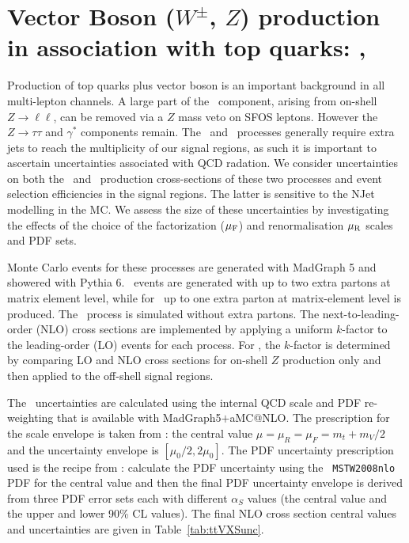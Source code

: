 \section{Vector Boson ($W^{\pm}$, $Z$) production in association with top quarks: \ttV, \tZ}  
\label{section:ttV}
Production of top quarks plus vector boson is an important background in all multi-lepton channels.   A large part of the \ttV\ component, arising from on-shell $Z\to\ell\ell$, can be removed via a $Z$ mass veto on SFOS leptons.  However the $Z \to \tau\tau$ and $\gamma^*$ components remain. The \ttW\ and \tZ\ processes generally require extra jets to reach the multiplicity of our signal regions, as such it is important to ascertain uncertainties associated with QCD radation. We consider uncertainties on both the \ttW\ and \ttZ\ production cross-sections of these two processes and event selection efficiencies in the signal regions. The latter is sensitive to the NJet modelling in the MC. We assess the size of these uncertainties by investigating the effects of the choice of the factorization ($\mu_{\rm F}$) and renormalisation $\mu_{\rm R}$ scales and PDF sets. 

Monte Carlo events for these processes are generated with MadGraph 5 and showered with Pythia 6.  \ttW\ events are generated with up to two extra partons at matrix element level, while for \ttZ\ up to one extra parton at matrix-element level is produced.  The \tZ\ process is simulated without extra partons.  The next-to-leading-order (NLO) cross sections are implemented by applying a uniform $k$-factor to the leading-order (LO) events for each process.  For \ttZ, the $k$-factor is determined by comparing LO and NLO cross sections for on-shell $Z$ production only and then applied to the off-shell signal regions.  

The \ttV\ uncertainties are calculated
using the internal QCD scale and PDF re-weighting that is available with
 MadGraph5$+$aMC@NLO. The prescription for the scale envelope is taken from
\cite{Garzelli:2012bn}: the central value $\mu=\mu_{R}=\mu_{F}=m_t+m_V/2$
and the uncertainty envelope is $[\mu_{0}/2,2\mu_{0}]$. The PDF
uncertainty prescription used is the recipe from
\cite{Campbell:2012dh}: calculate the PDF uncertainty using the {\tt
MSTW2008nlo}~\cite{Martin:2009iq} PDF for the central value and then the final PDF
uncertainty envelope is derived from three PDF error sets each with
different $\alpha_S$ values (the central value and the upper and lower
90\% CL values). The final NLO cross section central values and
uncertainties are given in Table~\ref{tab:ttVXSunc}.

